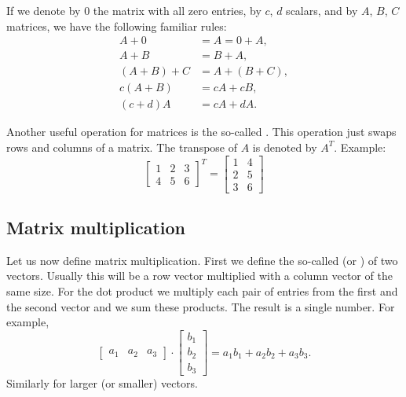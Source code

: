 If we denote by 0 the matrix with all zero entries, by
$c$, $d$ scalars, and by $A$, $B$, $C$ matrices, we
have the following familiar rules:
\begin{align*}
A + 0 & = A = 0 + A , \\
A + B & = B + A , \\
(A + B) + C & = A + (B + C) , \\
c(A+B) & = cA+cB, \\
(c+d)A & = cA + dA.
\end{align*}

Another useful operation for matrices is the so-called
\emph{}.  This operation just swaps rows and columns of a
matrix.
The transpose of $A$ is denoted by $A^T$.  Example:
\begin{equation*}
\begin{bmatrix}
1 & 2 & 3 \\
4 & 5 & 6
\end{bmatrix}^T =
\begin{bmatrix}
1 & 4 \\
2 & 5 \\
3 & 6 
\end{bmatrix}
\end{equation*}

\subsection{Matrix multiplication}

Let us now define matrix multiplication.  First we define the so-called
\emph{} (or \emph{}) of two vectors.
Usually this will be a row vector multiplied
with a column vector of the same size.  For the dot product we multiply
each pair of entries from the first and the second vector and we sum these
products.  The result is a single number.
For example,
\begin{equation*}
\begin{bmatrix}
a_1 & a_2 & a_3
\end{bmatrix}
\cdot
\begin{bmatrix}
b_1 \\
b_2 \\
b_3
\end{bmatrix}
= a_1 b_1 + a_2 b_2 + a_3 b_3 .
\end{equation*}
Similarly for larger (or smaller) vectors.

